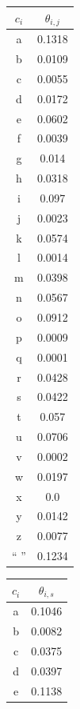 \documentclass[a4paper]{article}
\theoremstyle{definition}
\newenvironment{soln}{
    \leavevmode\color{blue}\ignorespaces
}{}
\begin{document}
\begin{enumerate}
\begin{soln}
    \begin{center}
        \begin{tabular}{c | c}
            $c_i$ & $\theta_{i, j}$\\ \hline
            a & 0.1318 \\
            b & 0.0109 \\
            c & 0.0055 \\
            d & 0.0172 \\
            e & 0.0602 \\
            f & 0.0039 \\
            g & 0.014 \\
            h & 0.0318 \\
            i & 0.097 \\
            j & 0.0023 \\
            k & 0.0574 \\
            l & 0.0014 \\
            m & 0.0398 \\
            n & 0.0567 \\
            o & 0.0912 \\
            p & 0.0009 \\
            q & 0.0001 \\
            r & 0.0428 \\
            s & 0.0422 \\
            t & 0.057 \\
            u & 0.0706 \\
            v & 0.0002 \\
            w & 0.0197 \\
            x & 0.0 \\
            y & 0.0142 \\
            z & 0.0077 \\
            `` '' & 0.1234 \\
        \end{tabular}
        \quad
        \begin{tabular}{c | c}
            $c_i$ & $\theta_{i, s}$\\ \hline
            a & 0.1046 \\
            b & 0.0082 \\
            c & 0.0375 \\
            d & 0.0397 \\
            e & 0.1138 \\

\end{tabular}
\end{center}
\end{soln}
\end{enumerate}
\end{document}
